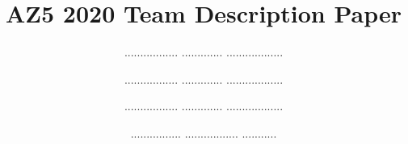 %

\documentclass[runningheads,a4paper]{llncs}
\usepackage{amssymb}
\setcounter{tocdepth}{3}
\usepackage{graphicx}
\usepackage{amssymb}
\usepackage{enumitem}
\usepackage[utf8]{inputenc}
\usepackage[hidelinks]{hyperref}
\usepackage{url}
\usepackage{float}
\usepackage{amsmath}
\usepackage{graphicx}
\usepackage{wrapfig}
\usepackage{fancyhdr}
\usepackage{titling}
\usepackage{xcolor}
\usepackage{lipsum}



%
\title{AZ5 2020 Team Description Paper}

\author{
  ................. ............. ..................
  \and ................. ............. ..................
  \and ................. ............. ..................
  \and ................ ................. ...........
}



\maketitle

